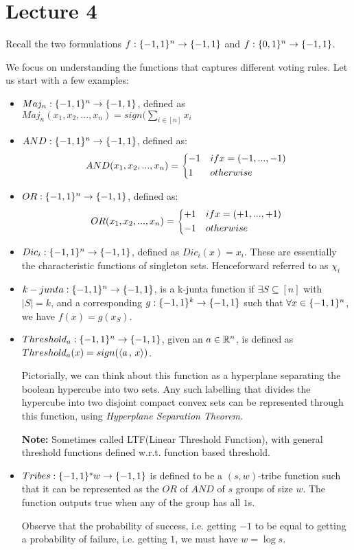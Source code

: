\chapter{Lecture 4}

Recall the two formulations ${f} : {\{-1,1\}^n} \rightarrow {\{-1,1\}}$ and ${f} : {\{0,1\}^n} \rightarrow {\{-1,1\}}$. 

We focus on understanding the functions that captures different voting rules. Let us start with a few examples:

\begin{itemize}
    \item ${Maj_n} : {\{-1,1\}^n} \rightarrow {\{-1,1\}}$, defined as $Maj_n(x_1,x_2,...,x_n) = sign(\sum_{i \in [n]} x_i$
    \item ${AND} : {\{-1,1\}^n} \rightarrow {\{-1,1\}}$, defined as:
    \[AND(x_1,x_2,...,x_n) = \begin{dcases}-1 & if x = (-1,...,-1)\\ 1 & otherwise\end{dcases}\]
    \item ${OR} : {\{-1,1\}^n} \rightarrow {\{-1,1\}}$, defined as:
    \[OR(x_1,x_2,...,x_n) = \begin{dcases}+1 & if x = (+1,...,+1)\\ -1 & otherwise\end{dcases}\]
    \item ${Dic_i} : {\{-1,1\}^n} \rightarrow {\{-1,1\}}$, defined as $Dic_i(x) = x_i$. These are essentially the characteristic functions of singleton sets. Henceforward referred to as $\chi_i$
    \item ${k-junta} : {\{-1,1\}^n} \rightarrow {\{-1,1\}}$, is a k-junta function if $\exists S \subseteq [n]$ with $|S| = k$, and a corresponding ${g} : {\{-1,1\}^k} \rightarrow {\{-1,1\}}$ such that $\forall x \in \{-1,1\}^n$, we have $f(x) = g(x_S)$.
    \item ${Threshold_a} : {\{-1,1\}^n} \rightarrow {\{-1,1\}}$, given an $a \in \mathbb{R}^n$, is defined as $Threshold_a(x) = sign(\left\langle {a} \,,\, {x} \right\rangle)$.

    Pictorially, we can think about this function as a hyperplane separating the boolean hypercube into two sets. Any such labelling that divides the hypercube into two disjoint compact convex sets can be represented through this function, using \emph{Hyperplane Separation Theorem}.

    \textbf{Note: } Sometimes called LTF(Linear Threshold Function), with general threshold functions defined w.r.t. function based threshold.

    \item ${Tribes} : {\{-1,1\}^sw} \rightarrow {\{-1,1\}}$ is defined to be a $(s,w)$-tribe function such that  it can be represented as the $OR$ of $AND$ of $s$ groups of size $w$. The function outputs true when any of the group has all $1$s. 

    Observe that the probability of success, i.e.  getting $-1$ to be equal to getting a probability of failure, i.e. getting $1$, we must have $w = \log{s}$.
\end{itemize}

